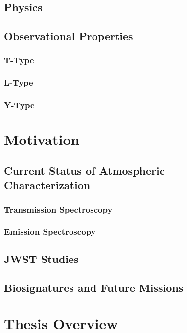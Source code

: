 \subsection{Physics}
\subsection{Observational Properties}
\subsubsection{T-Type}
\subsubsection{L-Type}
\subsubsection{Y-Type}

\section{Motivation}
\subsection{Current Status of Atmospheric Characterization}
\autocite{Kreidberg2018}%
\autocite{Biller2018} %
\autocite{Bozza} %
\autocite{Danielski2018} %
\autocite{Madhusudhan2016} %
\subsubsection{Transmission Spectroscopy}
\autocite{Lee2012} %
\autocite{MacDonald2017} %
\autocite{Madhusudhan} %
\subsubsection{Emission Spectroscopy}
\subsection{JWST Studies}
\autocite{Beichman2019} %
\subsection{Biosignatures and Future Missions}
\section{Thesis Overview}